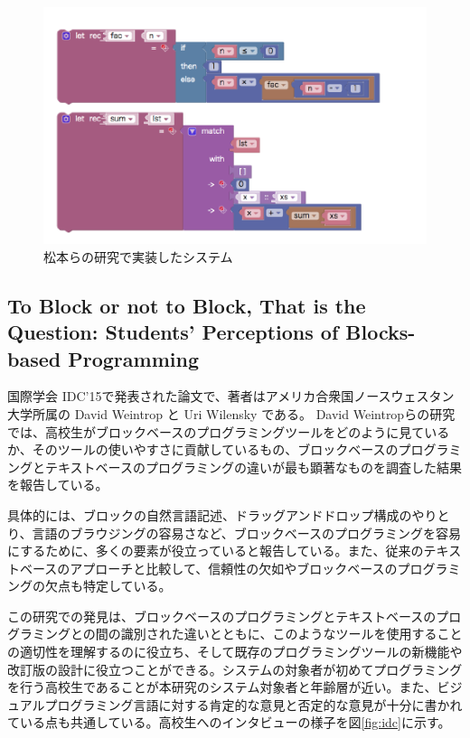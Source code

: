 \documentclass{risepaper}
\begin{document}
\begin{figure}[h]
\begin{center}
\includegraphics[scale=0.8]{img/otya.PNG}
\caption{松本らの研究で実装したシステム}%
\label{fig:otya}
\end{center}%
\end{figure}%

	\subsection{To Block or not to Block, That is the Question: Students’ Perceptions of Blocks-based Programming}
    
国際学会 IDC'15で発表された論文\cite{idc}で、著者はアメリカ合衆国ノースウェスタン大学所属の David Weintrop と Uri Wilensky である。
David Weintropらの研究では、高校生がブロックベースのプログラミングツールをどのように見ているか、そのツールの使いやすさに貢献しているもの、ブロックベースのプログラミングとテキストベースのプログラミングの違いが最も顕著なものを調査した結果を報告している。

具体的には、ブロックの自然言語記述、ドラッグアンドドロップ構成のやりとり、言語のブラウジングの容易さなど、ブロックベースのプログラミングを容易にするために、多くの要素が役立っていると報告している。また、従来のテキストベースのアプローチと比較して、信頼性の欠如やブロックベースのプログラミングの欠点も特定している。

この研究での発見は、ブロックベースのプログラミングとテキストベースのプログラミングとの間の識別された違いとともに、このようなツールを使用することの適切性を理解するのに役立ち、そして既存のプログラミングツールの新機能や改訂版の設計に役立つことができる。システムの対象者が初めてプログラミングを行う高校生であることが本研究のシステム対象者と年齢層が近い。また、ビジュアルプログラミング言語に対する肯定的な意見と否定的な意見が十分に書かれている点も共通している。高校生へのインタビューの様子を図\ref{fig:idc}に示す。
\end{document}
